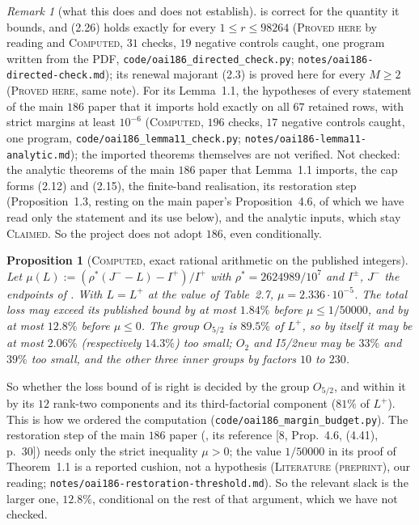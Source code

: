\documentclass[11pt]{amsart}
\newtheorem{proposition}[theorem]{Proposition}
\theoremstyle{definition}
\theoremstyle{remark}
\newtheorem{remark}[theorem]{Remark}
\newcommand{\lbl}[1]{\textup{\textsc{#1}}}
\begin{document}
\begin{remark}[what this does and does not establish]
is correct for the quantity it bounds, and (2.26) holds exactly for every $1\le r\le98264$ (\lbl{Proved here} by reading and \lbl{Computed}, $31$ checks,
$19$ negative controls caught, one program written from the PDF, \texttt{code/}\allowbreak\texttt{oai186\_directed\_check.py};
\texttt{notes/}\allowbreak\texttt{oai186-directed-check.md}); its renewal majorant (2.3) is proved here for every $M\ge2$
(\lbl{Proved here}, same note). For its Lemma~1.1, the hypotheses of every statement of the main $186$ paper that it
imports hold exactly on all $67$ retained rows, with strict margins at least $10^{-6}$ (\lbl{Computed}, $196$ checks,
$17$ negative controls caught, one program, \texttt{code/}\allowbreak\texttt{oai186\_}\allowbreak\texttt{lemma11\_check.py};
\texttt{notes/}\allowbreak\texttt{oai186-lemma11-analytic.md}); the imported theorems themselves are not verified.
Not checked: the analytic theorems of the main $186$ paper that Lemma~1.1 imports, the cap forms (2.12) and (2.15), the finite-band
realisation, its restoration
step (Proposition~1.3, resting on the main paper's Proposition~4.6, of which we have read only the statement and
its use below), and the analytic inputs, which stay \lbl{Claimed}. So the project does not adopt $186$, even conditionally.
\end{remark}

\begin{proposition}[\lbl{Computed}, exact rational arithmetic on the published integers]\label{prop:oai186-budget}
Let $\mu(L):=(\rho^*(J^--L)-I^+)/I^+$ with $\rho^*=2624989/10^7$ and $I^\pm$, $J^-$
the endpoints of \cite[(2.33)]{OAI26}. With $L=L^+$ at the value of Table~2.7,
$\mu=2.336\cdot10^{-5}$. The total loss may exceed its published bound by at most
$1.84\%$ before $\mu\le1/50000$, and by at most $12.8\%$ before $\mu\le0$. The
group $O_{5/2}$ is $89.5\%$ of $L^+$, so by itself it may be at most $2.06\%$
(respectively $14.3\%$) too small; $O_2$ and I5/2new may be $33\%$ and $39\%$ too
small, and the other three inner groups by factors $10$ to $230$.
\end{proposition}
\noindent So whether the loss bound of \cite{OAI26} is right is decided by the
group $O_{5/2}$, and within it by its $12$ rank-two components and its
third-factorial component ($81\%$ of $L^+$). This is how we ordered the
computation (\texttt{code/oai186\_margin\_budget.py}). The restoration step of the main $186$ paper
(\cite{OAI26}, its reference [8, Prop.~4.6, (4.41), p.~30]) needs only the strict inequality $\mu>0$; the value
$1/50000$ in its proof of Theorem~1.1 is a reported cushion, not a hypothesis (\lbl{Literature (preprint)}, our
reading; \texttt{notes/}\allowbreak\texttt{oai186-restoration-threshold.md}). So the relevant slack is the larger
one, $12.8\%$, conditional on the rest of that argument, which we have not checked.
\end{document}
